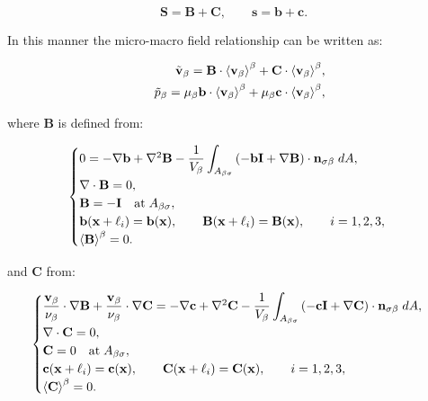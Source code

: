 $$
 \mathbf{S} = \mathbf{B} + \mathbf{C}, \qquad \mathbf{s} = \mathbf{b} + \mathbf{c}.
$$

\noindent In this manner the micro-macro field relationship can be written as:

\begin{eqnarray}
	&& \tilde{\textbf{v}}_{\beta} = \mathbf{B} \cdot {\left< \textbf{v}_{\beta}\right>}^{\beta} + \mathbf{C} \cdot {\left< \textbf{v}_{\beta}\right>}^{\beta},  	\label{eq:closure_viab_divison} \\
	&& \tilde{p}_{\beta} = \mu_{\beta} \mathbf{b} \cdot {\left< \textbf{v}_{\beta}\right>}^{\beta} + \mu_{\beta} \mathbf{c} \cdot {\left< \textbf{v}_{\beta}\right>}^{\beta}, \label{eq:closure_viab_hp}
\end{eqnarray}

where $\mathbf{B}$ is defined from:

\begin{eqnarray}
	\begin{cases}
		0 = -\nabla \mathbf{b} + \nabla^2 \mathbf{B} - \dfrac{1}{V_\beta} \displaystyle \int_{A_{\beta \sigma}}  \left(-\mathbf{b}\mathbf{I}  +  \nabla \mathbf{B} \right) \cdot \mathbf{n}_{\sigma \beta} \;dA,  \\
		\nabla \cdot \mathbf{B} = 0,  \\
		\mathbf{B} = -\mathbf{I} \quad \textrm{at} \; A_{\beta \sigma}, \\
		\mathbf{b}(\mathbf{x} +\ell_i) = \mathbf{b}(\mathbf{x}), \qquad \mathbf{B}(\mathbf{x} +\ell_i) = \mathbf{B}(\mathbf{x}), \qquad i=1,2,3 , \\
		{\left< \mathbf{B} \right>}^{\beta} = 0.
	\end{cases}
\label{eq:B_problem}
\end{eqnarray}

\newpage
and $\mathbf{C}$ from:

\begin{eqnarray}
	\begin{cases}
		\dfrac{\textbf{v}_{\beta}}{\nu_{\beta}} \cdot  \nabla \mathbf{B} +\dfrac{\textbf{v}_{\beta}}{\nu_{\beta}} \cdot  \nabla \mathbf{C} = -\nabla \mathbf{c} +  \nabla^2 \mathbf{C} - \dfrac{1}{V_\beta} \displaystyle \int_{A_{\beta \sigma}}  \left(-\mathbf{c}\mathbf{I}  +  \nabla \mathbf{C} \right) \cdot \mathbf{n}_{\sigma \beta} \;dA,  \\
		\nabla \cdot \mathbf{C} = 0, \\
		\mathbf{C} = 0 \quad \textrm{at} \; A_{\beta \sigma}, \\
		\mathbf{c}(\mathbf{x} +\ell_i) = \mathbf{c}(\mathbf{x}), \qquad \mathbf{C}(\mathbf{x} +\ell_i) = \mathbf{C}(\mathbf{x}), \qquad i=1,2,3 ,\\
		{\left< \mathbf{C} \right>}^{\beta} = 0.
	\end{cases}
\label{eq:C_problem}
\end{eqnarray}

